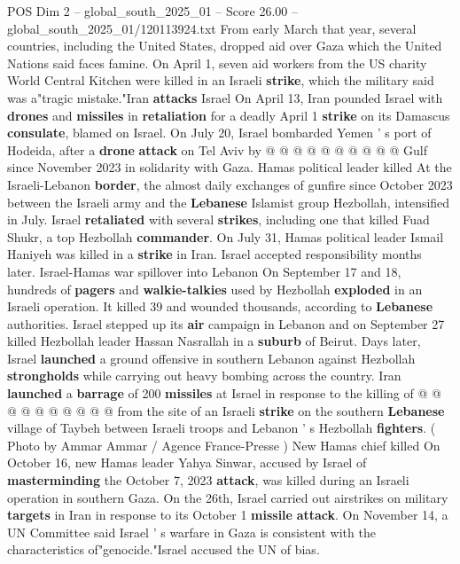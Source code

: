 \begin{textsample}{POS Dim 2 – global\_south\_2025\_01 – Score 26.00 – global\_south\_2025\_01/120113924.txt}
From early March that year, several countries, including the United States, dropped aid over Gaza which the United Nations said faces famine.
On April 1, seven aid workers from the US charity World Central Kitchen were killed in an Israeli \textbf{strike}, which the military said was a"tragic mistake."Iran \textbf{attacks} Israel On April 13, Iran pounded Israel with \textbf{drones} and \textbf{missiles} in \textbf{retaliation} for a deadly April 1 \textbf{strike} on its Damascus \textbf{consulate}, blamed on Israel.
On July 20, Israel bombarded Yemen ' s port of Hodeida, after a \textbf{drone} \textbf{attack} on Tel Aviv by @ @ @ @ @ @ @ @ @ @ Gulf since November 2023 in solidarity with Gaza.
Hamas political leader killed At the Israeli-Lebanon \textbf{border}, the almost daily exchanges of gunfire since October 2023 between the Israeli army and the \textbf{Lebanese} Islamist group Hezbollah, intensified in July.
Israel \textbf{retaliated} with several \textbf{strikes}, including one that killed Fuad Shukr, a top Hezbollah \textbf{commander}.
On July 31, Hamas political leader Ismail Haniyeh was killed in a \textbf{strike} in Iran.
Israel accepted responsibility months later.
Israel-Hamas war spillover into Lebanon On September 17 and 18, hundreds of \textbf{pagers} and \textbf{walkie-talkies} used by Hezbollah \textbf{exploded} in an Israeli operation.
It killed 39 and wounded thousands, according to \textbf{Lebanese} authorities.
Israel stepped up its \textbf{air} campaign in Lebanon and on September 27 killed Hezbollah leader Hassan Nasrallah in a \textbf{suburb} of Beirut.
Days later, Israel \textbf{launched} a ground offensive in southern Lebanon against Hezbollah \textbf{strongholds} while carrying out heavy bombing across the country.
Iran \textbf{launched} a \textbf{barrage} of 200 \textbf{missiles} at Israel in response to the killing of @ @ @ @ @ @ @ @ @ @ from the site of an Israeli \textbf{strike} on the southern \textbf{Lebanese} village of Taybeh between Israeli troops and Lebanon ' s Hezbollah \textbf{fighters}. ( Photo by Ammar Ammar / Agence France-Presse ) New Hamas chief killed On October 16, new Hamas leader Yahya Sinwar, accused by Israel of \textbf{masterminding} the October 7, 2023 \textbf{attack}, was killed during an Israeli operation in southern Gaza.
On the 26th, Israel carried out airstrikes on military \textbf{targets} in Iran in response to its October 1 \textbf{missile} \textbf{attack}.
On November 14, a UN Committee said Israel ' s warfare in Gaza is consistent with the characteristics of"genocide."Israel accused the UN of bias.

\end{textsample}
